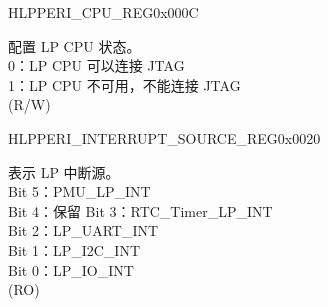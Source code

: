 \begin{register}{H}{LPPERI\_CPU\_REG}{0x000C}\label{regdesc:LPPERICPUREG}
%
%
\regnewline%
\begin{regdesc}\begin{reglist}
\label{fielddesc:LPPERILPCOREDBGMUNAVALIABLE}\item [LPPERI\_LPCORE\_DBGM\_UNAVALIABLE] 配置 LP CPU 状态。\\
0：LP CPU 可以连接 JTAG\\
1：LP CPU 不可用，不能连接 JTAG\\
(R/W)
\end{reglist}\end{regdesc}
\end{register}


\begin{register}{H}{LPPERI\_INTERRUPT\_SOURCE\_REG}{0x0020}\label{regdesc:LPPERIINTERRUPTSOURCEREG}
%
%
\regnewline%
\begin{regdesc}\begin{reglist}
\label{fielddesc:LPPERILPINTERRUPTSOURCE}\item [LPPERI\_LP\_INTERRUPT\_SOURCE] 表示 LP 中断源。\\
Bit 5：PMU\_LP\_INT\\
Bit 4：保留
Bit 3：RTC\_Timer\_LP\_INT\\
Bit 2：LP\_UART\_INT\\
Bit 1：LP\_I2C\_INT\\
Bit 0：LP\_IO\_INT\\
(RO)
\end{reglist}\end{regdesc}
\end{register}
